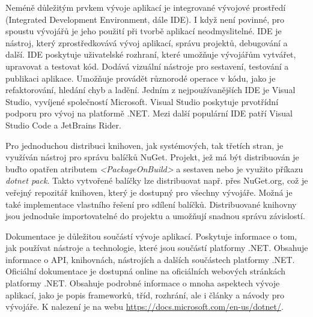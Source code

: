 
Neméně důležitým prvkem vývoje aplikací je integrované vývojové prostředí (Integrated Development Environment, dále IDE). I když není povinné, pro spoustu vývojářů je jeho použití při tvorbě aplikací neodmyslitelné. IDE je nástroj, který zprostředkovává vývoj aplikací, správu projektů, debugování a další. IDE poskytuje uživatelské rozhraní, které umožňuje vývojářům vytvářet, upravovat a testovat kód. Dodává vizuální nástroje pro sestavení, testování a publikaci aplikace. Umožňuje provádět různorodé operace v kódu, jako je refaktorování, hledání chyb a ladění. Jedním z nejpoužívanějších IDE je Visual Studio, vyvíjené společností Microsoft. Visual Studio poskytuje prvotřídní podporu pro vývoj na platformě .NET. Mezi další populární IDE patří Visual Studio Code a JetBrains Rider.


Pro jednoduchou distribuci knihoven, jak systémových, tak třetích stran, je využíván nástroj pro správu balíčků NuGet. Projekt, jež má být distribuován je buďto opatřen atributem \emph{<PackageOnBuild>} a sestaven nebo je využito příkazu \emph{dotnet pack}. Takto vytvořené balíčky lze distribuovat např. přes NuGet.org, což je veřejný repozitář knihoven, který je dostupný pro všechny vývojáře. Možná je také implementace vlastního řešení pro sdílení balíčků. Distribuované knihovny jsou jednoduše importovatelné do projektu a umožňují snadnou správu závislostí.


Dokumentace je důležitou součástí vývoje aplikací. Poskytuje informace o tom, jak používat nástroje a technologie, které jsou součástí platformy .NET. Obsahuje informace o API, knihovnách, nástrojích a dalších součástech platformy .NET. Oficiální dokumentace je dostupná online na oficiálních webových stránkách platformy .NET. Obsahuje podrobné informace o mnoha aspektech vývoje aplikací, jako je popis frameworků, tříd, rozhrání, ale i články a návody pro vývojáře. K nalezení je na webu \url{https://docs.microsoft.com/en-us/dotnet/}.


